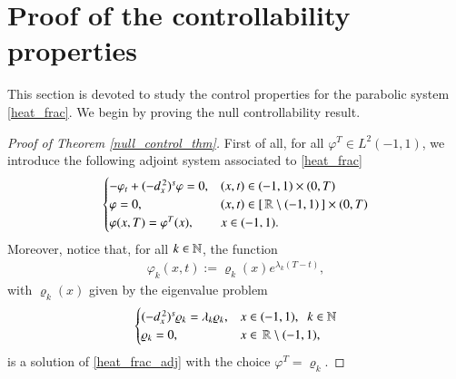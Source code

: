 \section{Proof of the controllability properties}\label{control_sec}

This section is devoted to study the control properties for the parabolic system \eqref{heat_frac}. We begin by proving the null controllability result.

\begin{proof}[Proof of Theorem \ref{null_control_thm}]
First of all, for all $\varphi^T\in L^2(-1,1)$, we introduce the following adjoint system associated to \eqref{heat_frac}
\begin{align}\label{heat_frac_adj}
	\begin{cases}
		-\varphi_t + (-d_x^{\,2})^{s}\varphi = 0, & (x,t)\in (-1,1)\times(0,T)
		\\
		\varphi = 0, & (x,t)\in [\,\mathbb{R}\setminus(-1,1)\,]\times(0,T)
		\\
		\varphi(x,T) = \varphi^T(x), & x\in (-1,1).
	\end{cases}
\end{align}
Moreover, notice that, for all $k\in\mathbb{N}$, the function 
\begin{align*}
	\varphi_k(x,t):= \varrho_k(x)e^{\lambda_k(T-t)},
\end{align*}
with $\varrho_k(x)$ given by the eigenvalue problem 
\begin{align*}
	\begin{cases}
		(-d_x^{\,2})^{s}\varrho_k = \lambda_k\varrho_k, & x\in (-1,1), \;\; k\in\mathbb{N}
		\\
		\varrho_k = 0, & x\in \,\mathbb{R}\setminus(-1,1),
	\end{cases}
\end{align*}
is a solution of \eqref{heat_frac_adj} with the choice $\varphi^T=\varrho_k$.


\end{proof}
